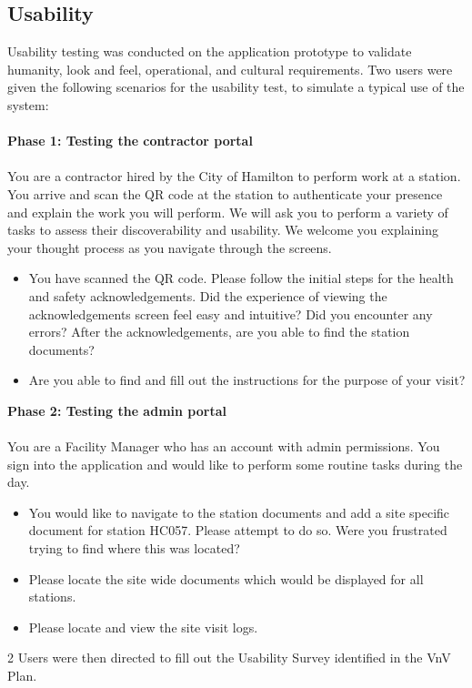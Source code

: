 \documentclass[12pt, titlepage]{article}
\begin{document}
\subsection{Usability}
Usability testing was conducted on the application prototype to
validate humanity, look and feel, operational, and cultural requirements.
Two users were given the following scenarios for the usability test,
to simulate a typical use of the system:\\
\\
\textbf{Phase 1: Testing the contractor portal}
\\\\
You are a contractor hired by the City of Hamilton to perform work at a station.
You arrive and scan the QR code at the station to authenticate your
presence and explain the work you will perform.
We will ask you to perform a variety of tasks to assess their
discoverability and usability.
We welcome you explaining your thought process as you navigate
through the screens.
\begin{itemize}
  \item You have scanned the QR code. Please follow the initial steps
    for the health and safety acknowledgements. Did the experience of
    viewing the acknowledgements screen feel easy and intuitive? Did
    you encounter any errors?
    After the acknowledgements, are you able to find the station documents?
  \item Are you able to find and fill out the instructions for the
    purpose of your visit?
\end{itemize}
\textbf{Phase 2: Testing the admin portal}
\\\\
You are a Facility Manager who has an account with admin permissions.
You sign into the application and would like to perform some routine
tasks during the day.
\begin{itemize}
  \item You would like to navigate to the station documents and add a
    site specific document for station HC057. Please attempt to do
    so. Were you frustrated trying to find where this was located?
  \item Please locate the site wide documents which would be
    displayed for all stations.
  \item Please locate and view the site visit logs.
\end{itemize}
2 Users were then directed to fill out the Usability Survey
identified in the VnV Plan.\\
\end{document}

